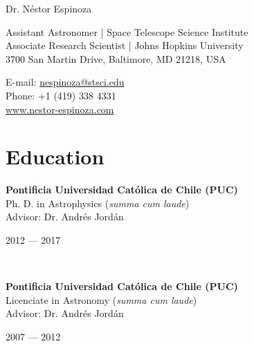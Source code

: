 \documentclass[12pt, a4paper]{article} %
\begin{document}

{\LARGE Dr. N\'estor Espinoza}\\[0.2cm] %
\begin{minipage}[t]{0.63\textwidth}
Assistant Astronomer | Space Telescope Science Institute\\
Associate Research Scientist | Johns Hopkins University\\
3700 San Martin Drive, Baltimore, MD 21218, USA \\
\end{minipage}
\begin{minipage}[t]{0.37\textwidth}
E-mail: \href{mailto:nespinoza@stsci.edu}{nespinoza@stsci.edu}\\
Phone: +1 (419) 338 4331\\ 
\url{www.nestor-espinoza.com}
\end{minipage}

\hrulefill
\section*{Education}


\begin{minipage}[t]{0.6\textwidth}
\begin{flushleft}%
  \setlength{\leftskip}{0.2cm}%
\textbf{Pontificia Universidad Cat\'olica de Chile (PUC)}\\
Ph. D. in Astrophysics (\textit{summa cum laude})\\
Advisor: Dr. Andr\'es Jord\'an
 
\end{flushleft}
\end{minipage}
\begin{minipage}[t]{0.4\textwidth}
\hfill 2012 --- 2017 
\end{minipage}\\

\begin{minipage}[t]{0.6\textwidth}
\begin{flushleft}%
  \setlength{\leftskip}{0.2cm}%
\textbf{Pontificia Universidad Cat\'olica de Chile (PUC)}\\
 Licenciate in Astronomy (\textit{summa cum laude})\\
 Advisor: Dr. Andr\'es Jord\'an
 \end{flushleft}
\end{minipage}
\begin{minipage}[t]{0.4\textwidth}
\hfill 2007 --- 2012 
\end{minipage}
\end{document}
